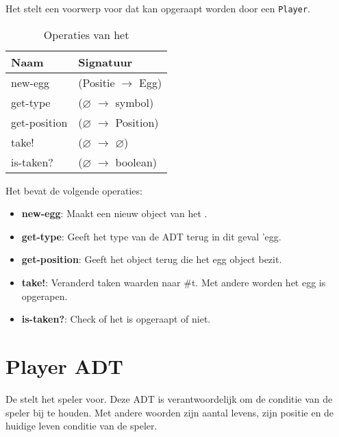 Het \texttt{} stelt een voorwerp voor dat kan opgeraapt  worden door een \texttt{Player}.

\begin{table}[hbt]
\centering
\begin{tabular}{|ll|}
\hline
\rowcolor[HTML]{000000} 
{\color[HTML]{FFFFFF} \textbf{Naam}} & {\color[HTML]{FFFFFF} \textbf{Signatuur}} \\ \hline
new-egg                              & (Positie $\rightarrow$ Egg) \\ \hline
get-type         & ($\varnothing$ $\rightarrow$ symbol)                        \\ \hline
get-position         & ($\varnothing$ $\rightarrow$ Position)                        \\ \hline
take!                              & ($\varnothing$ $\rightarrow$ $\varnothing$)                   \\ \hline
is-taken?                         & ($\varnothing$ $\rightarrow$ boolean)               \\ \hline
\end{tabular}
\caption{Operaties van het \texttt{}}
\label{table:item}
\end{table}

Het \texttt{} bevat de volgende operaties:

\begin{itemize}
	\item \textbf{new-egg}: Maakt een nieuw object van het \texttt{}.
	\item \textbf{get-type}: Geeft het type van de ADT terug in dit geval 'egg.
	\item \textbf{get-position}: Geeft het \texttt{} object terug die het egg object bezit.
	\item \textbf{take!}: Veranderd taken waarden naar \#t.
		Met andere worden het egg is opgerapen.
	\item \textbf{is-taken?}: Check of het \texttt{} is opgeraapt of niet.
\end{itemize}

\section{Player ADT}
\label{section:player}
De \texttt{} stelt het speler voor.
Deze ADT is verantwoordelijk om de conditie van de speler bij te houden.
Met andere woorden zijn aantal levens, zijn positie en de huidige leven conditie van de speler.

